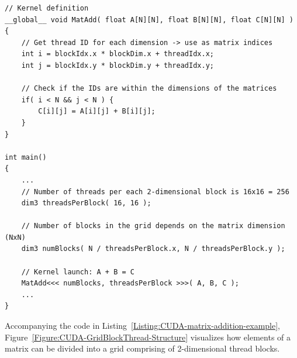 \begin{lstlisting}[caption={Example of C++ pseudocode of a kernel that adds two matrices using 2-dimensional thread blocks. Since each thread has a unique \code{globalID} for each of two dimensions, then those IDs can be used as indices for adding matrix elements. This simple example does not take into account allocation and copying data from host to device. Taken from Nvidia's \emph{CUDA C++ Programming Guide} \cite{NVIDIAMay2022}.},label={Listing:CUDA-matrix-addition-example}]
// Kernel definition
__global__ void MatAdd( float A[N][N], float B[N][N], float C[N][N] )
{
	// Get thread ID for each dimension -> use as matrix indices
	int i = blockIdx.x * blockDim.x + threadIdx.x;
	int j = blockIdx.y * blockDim.y + threadIdx.y;
	
	// Check if the IDs are within the dimensions of the matrices
	if( i < N && j < N ) {
		C[i][j] = A[i][j] + B[i][j];
	}
}

int main()
{
	...
	// Number of threads per each 2-dimensional block is 16x16 = 256
	dim3 threadsPerBlock( 16, 16 );
	
	// Number of blocks in the grid depends on the matrix dimension (NxN)
	dim3 numBlocks( N / threadsPerBlock.x, N / threadsPerBlock.y );
	
	// Kernel launch: A + B = C
	MatAdd<<< numBlocks, threadsPerBlock >>>( A, B, C );
	...
}
\end{lstlisting}

Accompanying the code in Listing~\ref{Listing:CUDA-matrix-addition-example}, Figure~\ref{Figure:CUDA-GridBlockThread-Structure} visualizes how elements of a matrix can be divided into a grid comprising of 2-dimensional thread blocks.

